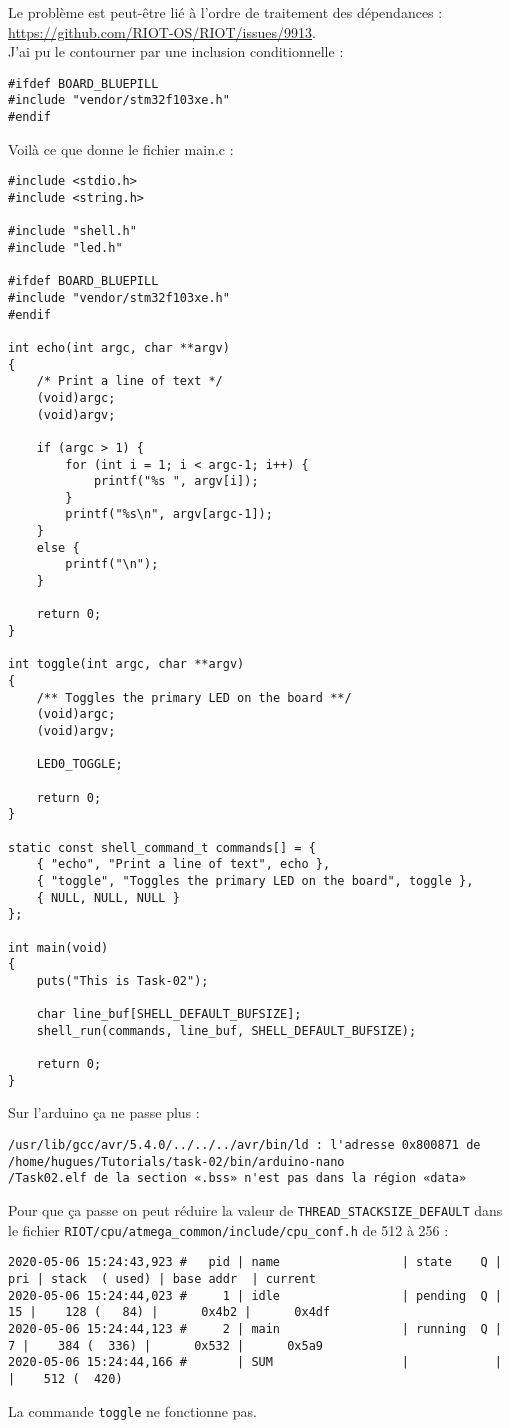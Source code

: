 Le problème est peut-être lié à l'ordre de traitement des dépendances
 : \url{https://github.com/RIOT-OS/RIOT/issues/9913}.\\
 
J'ai pu le contourner par une inclusion conditionnelle :
\begin{lstlisting}
#ifdef BOARD_BLUEPILL
#include "vendor/stm32f103xe.h"
#endif
\end{lstlisting}


Voilà ce que donne le fichier main.c :
\begin{lstlisting}
#include <stdio.h>
#include <string.h>

#include "shell.h"
#include "led.h"

#ifdef BOARD_BLUEPILL
#include "vendor/stm32f103xe.h"
#endif

int echo(int argc, char **argv)
{
    /* Print a line of text */
    (void)argc;
    (void)argv;
    
    if (argc > 1) {
    	for (int i = 1; i < argc-1; i++) {
	        printf("%s ", argv[i]);
	    }
		printf("%s\n", argv[argc-1]);
    }
    else {
		printf("\n");
	}
	
    return 0;
}

int toggle(int argc, char **argv)
{
	/** Toggles the primary LED on the board **/
    (void)argc;
    (void)argv;

	LED0_TOGGLE;
	
	return 0;
}

static const shell_command_t commands[] = {
    { "echo", "Print a line of text", echo },
    { "toggle", "Toggles the primary LED on the board", toggle },
    { NULL, NULL, NULL }
};

int main(void)
{
    puts("This is Task-02");

    char line_buf[SHELL_DEFAULT_BUFSIZE];
    shell_run(commands, line_buf, SHELL_DEFAULT_BUFSIZE);

    return 0;
}
\end{lstlisting}

Sur l'arduino ça ne passe plus :
{\scriptsize
\begin{verbatim}
/usr/lib/gcc/avr/5.4.0/../../../avr/bin/ld : l'adresse 0x800871 de /home/hugues/Tutorials/task-02/bin/arduino-nano
/Task02.elf de la section «.bss» n'est pas dans la région «data»
\end{verbatim}
}
Pour que ça passe on peut réduire la valeur de
\texttt{THREAD\_STACKSIZE\_DEFAULT} dans le fichier
\texttt{RIOT/cpu/atmega\_common/include/cpu\_conf.h} de 512 à 256 :
{\scriptsize
\begin{verbatim}
2020-05-06 15:24:43,923 # 	pid | name                 | state    Q | pri | stack  ( used) | base addr  | current     
2020-05-06 15:24:44,023 # 	  1 | idle                 | pending  Q |  15 |    128 (   84) |      0x4b2 |      0x4df 
2020-05-06 15:24:44,123 # 	  2 | main                 | running  Q |   7 |    384 (  336) |      0x532 |      0x5a9 
2020-05-06 15:24:44,166 # 	    | SUM                  |            |     |    512 (  420)
\end{verbatim}
}
La commande \texttt{toggle} ne fonctionne pas.\\

